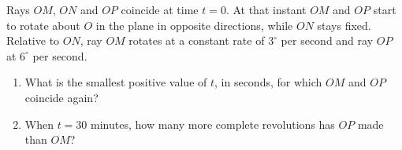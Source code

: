 Rays $OM$, $ON$ and $OP$ coincide at time $t=0$. At that instant $OM$ and $OP$ start to rotate about $O$ in the plane in opposite directions, while $ON$ stays fixed. Relative to $ON$, ray $OM$ rotates at a constant rate of $3^\circ$ per second and ray $OP$ at $6^\circ$ per second.
\begin{enumerate}
\item[(a)] What is the smallest positive value of $t$, in seconds, for which $OM$ and $OP$ coincide again?
\item[(b)] When $t=30$ minutes, how many more complete revolutions has $OP$ made than $OM$?
\end{enumerate}
